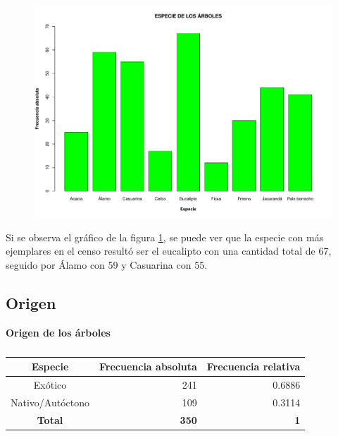 \documentclass[11pt]{article}
\begin{document}
\begin{figure}[h!]
  \begin{center}
    \includegraphics[width=0.9\linewidth]{barrasEspecie.pdf}
    \caption{}
    \label{fig:barrasEspecie}
  \end{center}  
\end{figure}

\begin{justify}
  Si se observa el gráfico de la figura \ref{fig:barrasEspecie},
  se puede ver que la especie con más ejemplares en el censo resultó
  ser el eucalipto con una cantidad total de 67, seguido por Álamo
  con 59 y Casuarina con 55.
\end{justify}


\newpage
\subsection{Origen}

\begin{table}[h!]
  \begin{center}
    \caption*{\textbf{Origen de los árboles}}
    \begin{tabular}{| c | r | r |}
      \hline
      \textbf{Especie} & \textbf{Frecuencia absoluta} & 
      \textbf{Frecuencia relativa} \\ \hline
      Exótico	& 241	& 0.6886 \\ \hline
      Nativo/Autóctono & 109 & 0.3114 \\ \hline
      \textbf{Total} & \textbf{350} & \textbf{1} \\ \hline
    \end{tabular}
    \caption{}
    \label{tab:tablaOrigen}
  \end{center}
\end{table}
\end{document}
